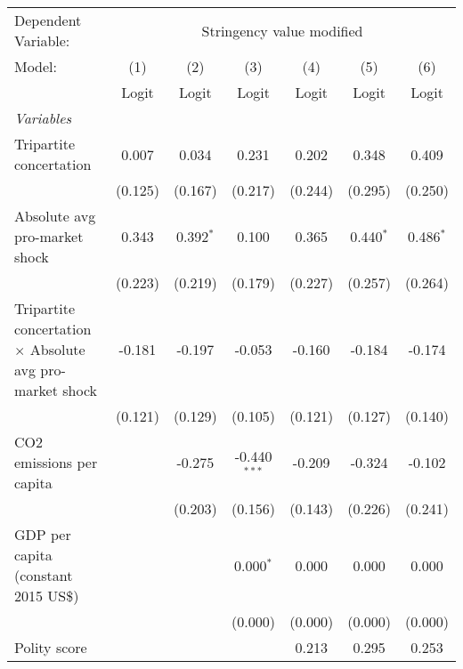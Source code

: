 
\begingroup
\centering
\begin{tabular}{lcccccc}
   \toprule
   Dependent Variable: & \multicolumn{6}{c}{Stringency value modified}\\
   Model:                                                          & (1)     & (2)         & (3)            & (4)     & (5)         & (6)\\  
                                                                   &  Logit  & Logit       & Logit          & Logit   & Logit       & Logit\\  
   \midrule
   \emph{Variables}\\
   Tripartite concertation                                         & 0.007   & 0.034       & 0.231          & 0.202   & 0.348       & 0.409\\   
                                                                   & (0.125) & (0.167)     & (0.217)        & (0.244) & (0.295)     & (0.250)\\   
   Absolute avg pro-market shock                                   & 0.343   & 0.392$^{*}$ & 0.100          & 0.365   & 0.440$^{*}$ & 0.486$^{*}$\\   
                                                                   & (0.223) & (0.219)     & (0.179)        & (0.227) & (0.257)     & (0.264)\\   
   Tripartite concertation $\times$ Absolute avg pro-market shock  & -0.181  & -0.197      & -0.053         & -0.160  & -0.184      & -0.174\\   
                                                                   & (0.121) & (0.129)     & (0.105)        & (0.121) & (0.127)     & (0.140)\\   
   CO2 emissions per capita                                        &         & -0.275      & -0.440$^{***}$ & -0.209  & -0.324      & -0.102\\   
                                                                   &         & (0.203)     & (0.156)        & (0.143) & (0.226)     & (0.241)\\   
   GDP per capita (constant 2015 US\$)                             &         &             & 0.000$^{*}$    & 0.000   & 0.000       & 0.000\\   
                                                                   &         &             & (0.000)        & (0.000) & (0.000)     & (0.000)\\   
   Polity score                                                    &         &             &                & 0.213   & 0.295       & 0.253\\   

\end{tabular}
